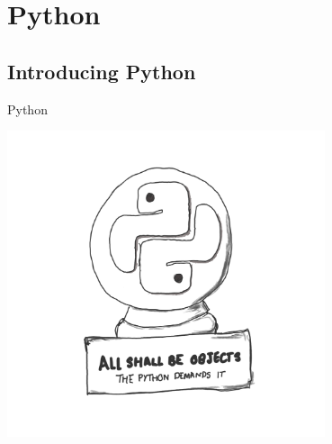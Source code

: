 \documentclass[10pt]{beamer}
\begin{document}
\section{Python}
\label{sec:org81d6e21}

\subsection{Introducing Python}
\label{sec:orgab38537}

\begin{frame}[label={sec:orgd3b1c69}]{Python}
\begin{center}
\includegraphics[width=0.7\textwidth]{./images/python-objects.png}
\end{center}
\end{frame}
\end{document}
